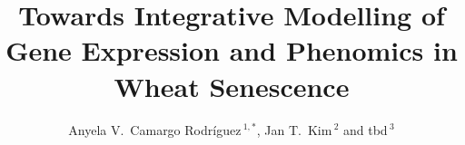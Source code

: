 \documentclass{frontiersSCNS} %
\def\firstAuthorLast{tbd {et~al.}} %
\def\Authors{Anyela V.\ Camargo Rodr\'{i}guez\,$^{1,*}$, Jan T.\ Kim\,$^{2}$ and tbd\,$^3$}
\begin{document}
\onecolumn
{}

\title[Integrative Wheat Senescence Modelling]{Towards Integrative
  Modelling of Gene Expression and Phenomics in Wheat Senescence}

\author[\firstAuthorLast ]{\Authors} %
\address{} %
\correspondance{} %

\extraAuth{}%


\maketitle

\end{document}
